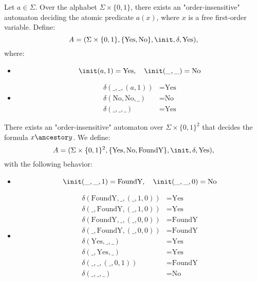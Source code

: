 \documentclass[a4paper,UKenglish,cleveref, autoref, thm-restate]{lipics-v2021}
\begin{document}
\begin{lemma}\label{lem:atomic-a}
	Let $a \in \Sigma$. Over the alphabet $\Sigma \times \{0,1\}$, there exists an "order-insensitive" automaton deciding the atomic predicate $a(x)$, where $x$ is a free first-order variable. Define:
	\[
		A = (\Sigma \times \{0,1\}, \{\text{Yes}, \text{No}\}, \init, \delta, \text{Yes}),
	\]
	where:
	\begin{itemize}
		\item
		      \[
			      \init(a,1) = \text{Yes}, \quad \init(\_,\_) = \text{No}
		      \]
		\item
		      \[
			      \begin{aligned}
				      \delta(\_, \_, (a,1))            & = \text{Yes} \\
				      \delta(\text{No}, \text{No}, \_) & = \text{No}  \\
				      \delta(\_, \_, \_)               & = \text{Yes}
			      \end{aligned}
		      \]
	\end{itemize}
\end{lemma}

\begin{lemma}\label{lem:atomic-ancestor}
	There exists an "order-insensitive" automaton over $\Sigma \times \{0,1\}^2$ that decides the formula $x \ancestor y$. We define:
	\[
		A = (\Sigma \times \{0,1\}^2, \{\text{Yes}, \text{No}, \text{FoundY}\}, \init, \delta, \text{Yes}),
	\]
	with the following behavior:
	\begin{itemize}
		\item
		      \[
			      \init(\_,\_,1) = \text{FoundY}, \quad \init(\_,\_,0) = \text{No}
		      \]
		\item
		      \[
			      \begin{aligned}
				      \delta(\text{FoundY}, \_, (\_,1,0)) & = \text{Yes}    \\
				      \delta(\_, \text{FoundY}, (\_,1,0)) & = \text{Yes}    \\
				      \delta(\text{FoundY}, \_, (\_,0,0)) & = \text{FoundY} \\
				      \delta(\_, \text{FoundY}, (\_,0,0)) & = \text{FoundY} \\
				      \delta(\text{Yes}, \_, \_)          & = \text{Yes}    \\
				      \delta(\_, \text{Yes}, \_)          & = \text{Yes}    \\
				      \delta(\_, \_, (\_,0,1))            & = \text{FoundY} \\
				      \delta(\_, \_, \_)                  & = \text{No}
			      \end{aligned}
		      \]
	\end{itemize}
\end{lemma}
\end{document}
